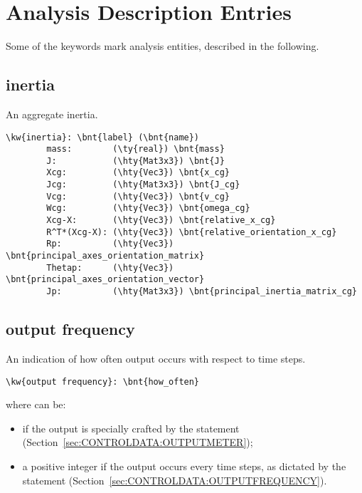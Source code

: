 \section{Analysis Description Entries}
Some of the keywords mark analysis entities, described in the following.

\subsection{inertia}
An aggregate inertia.
\begin{Verbatim}[commandchars=\\\{\}]
    \kw{inertia}: \bnt{label} (\bnt{name})
        mass:        (\ty{real}) \bnt{mass}
        J:           (\hty{Mat3x3}) \bnt{J}
        Xcg:         (\hty{Vec3}) \bnt{x_cg}
        Jcg:         (\hty{Mat3x3}) \bnt{J_cg}
        Vcg:         (\hty{Vec3}) \bnt{v_cg}
        Wcg:         (\hty{Vec3}) \bnt{omega_cg}
        Xcg-X:       (\hty{Vec3}) \bnt{relative_x_cg}
        R^T*(Xcg-X): (\hty{Vec3}) \bnt{relative_orientation_x_cg}
        Rp:          (\hty{Vec3}) \bnt{principal_axes_orientation_matrix}
        Thetap:      (\hty{Vec3}) \bnt{principal_axes_orientation_vector}
        Jp:          (\hty{Mat3x3}) \bnt{principal_inertia_matrix_cg}
\end{Verbatim}

\subsection{output frequency}
An indication of how often output occurs with respect to time steps.
\begin{Verbatim}[commandchars=\\\{\}]
\kw{output frequency}: \bnt{how_often}
\end{Verbatim}
where  can be:
\begin{itemize}
\item {} if the output is specially crafted by the
 statement (Section~\ref{sec:CONTROLDATA:OUTPUTMETER});
\item a positive integer if the output occurs every 
time steps, as dictated by the  statement
(Section~\ref{sec:CONTROLDATA:OUTPUTFREQUENCY}).
\end{itemize}

